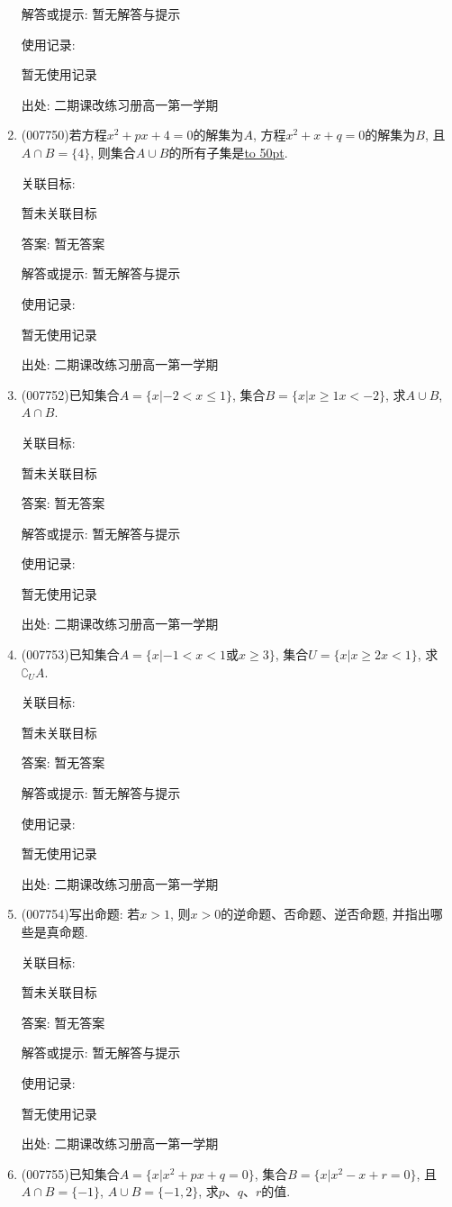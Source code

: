 \documentclass[10pt,a4paper]{article}
\newcommand{\blank}[1]{\underline{\hbox to #1pt{}}}
\begin{document}
\begin{enumerate}[1.]
解答或提示: 暂无解答与提示

使用记录:

暂无使用记录


出处: 二期课改练习册高一第一学期
\item { (007750)}若方程$x^2+px+4=0$的解集为$A$, 方程$x^2+x+q=0$的解集为$B$, 且$A\cap B=\{4\}$, 则集合$A\cup B$的所有子集是\blank{50}.


关联目标:

暂未关联目标

答案: 暂无答案

解答或提示: 暂无解答与提示

使用记录:

暂无使用记录


出处: 二期课改练习册高一第一学期
\item { (007752)}已知集合$A=\{x|-2<x\le 1\}$, 集合$B=\{x|x\ge 1x<-2\}$, 求$A\cup B$, $A\cap B$.


关联目标:

暂未关联目标

答案: 暂无答案

解答或提示: 暂无解答与提示

使用记录:

暂无使用记录


出处: 二期课改练习册高一第一学期
\item { (007753)}已知集合$A=\{x|-1<x<1$或$x\ge 3\}$, 集合$U=\{x|x\ge 2x<1\}$, 求$\complement _UA$.


关联目标:

暂未关联目标

答案: 暂无答案

解答或提示: 暂无解答与提示

使用记录:

暂无使用记录


出处: 二期课改练习册高一第一学期
\item { (007754)}写出命题: 若$x>1$, 则$x>0$的逆命题、否命题、逆否命题, 并指出哪些是真命题.


关联目标:

暂未关联目标

答案: 暂无答案

解答或提示: 暂无解答与提示

使用记录:

暂无使用记录


出处: 二期课改练习册高一第一学期
\item { (007755)}已知集合$A=\{x|x^2+px+q=0\}$, 集合$B=\{x|x^2-x+r=0\}$, 且$A\cap B=\{-1\}$, $A\cup B=\{-1,2\}$, 求$p$、$q$、$r$的值.



\end{enumerate}
\end{document}
